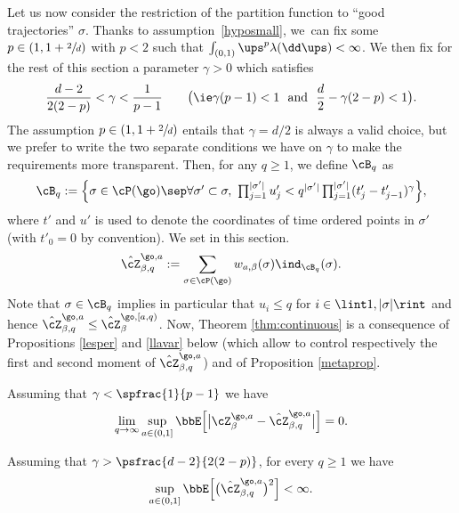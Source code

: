 Let us now consider the restriction of the partition function to ``good trajectories'' $\sigma$.
Thanks to assumption~\eqref{hyposmall}, we~can fix some $p\in (1,1+\sfrac 2d)$ with $p<2$ such that $\int_{(0,1)} \ups^{p} \lambda(\dd \ups)<\infty$.
We then fix for the rest of this section a parameter $\gamma>0$ which satisfies
\begin{equation}
\label{lesdeuxconds}
\frac{d-2}{2(2-p)} < \gamma < \frac{1}{p-1} \qquad \bigl(\text{\ie}\gamma(p-1)<1 \ \text{ and } \ \frac d2 -\gamma(2-p) <1 \bigr).
\end{equation}
The assumption $p \in (1, 1+\sfrac 2d)$ entails that $\gamma=d/2$ is always a valid choice, but
we prefer to write the two separate conditions we have on $\gamma$ to make the requirements more transparent.
Then, for any $q \geq 1$, we define $ \cB_q$ as
\begin{equation}
\label{def:BNcont}\textstyle
\cB_q :=\Bigl\{ \sigma \in \cP(\go) \sep \forall \sigma'\subset \sigma, \ \prod_{j=1}^{|\sigma'|} u'_j < q^{|\sigma'|} \prod_{j=1}^{|\sigma'|} (t_j'-t_{j-1}')^{\gamma} \Bigr\},
\end{equation}
where $t'$ and $u'$ is used to denote the coordinates of time ordered points in $\sigma'$ (with $t'_0=0$ by convention).
We set in this section.
\begin{equation}
\hat \cZ^{\go,a}_{\beta,q}:= \sum_{\sigma \in \cP(\go)} w_{a,\beta}(\sigma) \ind_{ \cB_q}(\sigma).
\end{equation}
Note that $\sigma\in \cB_q$ implies in particular that $u_i\le q$ for $i\in \lint 1, |\sigma| \rint$ and hence $\hat \cZ^{\go,a}_{\beta,q}\le \hat \cZ^{\go,[a,q)}_{\beta}$.
Now, Theorem \ref{thm:continuous} is a consequence of Propositions \ref{lesper} and \ref{llavar} below (which allow to control respectively the first and second moment of $\hat \cZ^{\go,a}_{\beta,q}$) and of Proposition \ref{metaprop}.

\begin{proposition}\label{lesper}
Assuming that $\gamma < \spfrac{1}{p-1}$ we have
\begin{equation}\label{unif1}
\lim_{q \to \infty} \sup_{a\in(0,1]} \bbE \Bigl[ \big| \cZ^{\go,a}_{\beta}- \hat \cZ^{\go,a}_{\beta,q} \big| \Bigr]=0.
\end{equation}
\end{proposition}

\begin{proposition}\label{llavar}
Assuming that $\gamma>\psfrac{d-2}{2(2-p)}$,
for every $q\ge 1$ we have
\begin{equation}\label{unif2}
\sup_{a\in(0,1]} \bbE \Bigl[ \bigl(\hat \cZ^{\go,a}_{\beta,q} \bigr)^2 \Bigr]<\infty.
\end{equation}
\end{proposition}

